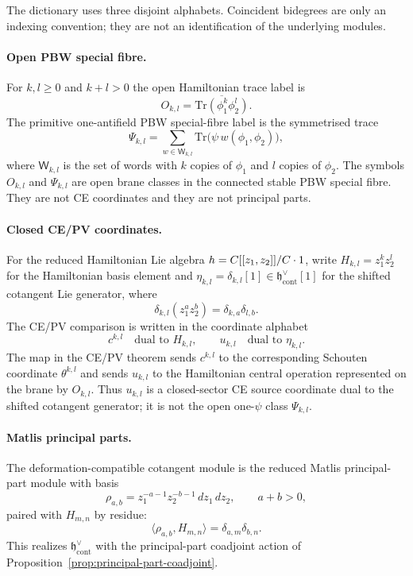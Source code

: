 \documentclass[11pt]{memoir}
\begin{document}
The dictionary uses three disjoint alphabets.  Coincident bidegrees are
only an indexing convention; they are not an identification of the
underlying modules.

\paragraph{Open PBW special fibre.}
For $k,l\geq0$ and $k+l>0$ the open Hamiltonian trace label is
$$O_{k,l}=\overline{\mathrm{Tr}(\phi_1^k\phi_2^l)}.$$
The primitive one-antifield PBW special-fibre label is the symmetrised
trace
$$\Psi_{k,l}
  =\sum_{w\in\mathsf W_{k,l}}
    \mathrm{Tr}\bigl(\psi\,w(\phi_1,\phi_2)\bigr),$$
where $\mathsf W_{k,l}$ is the set of words with $k$ copies of
$\phi_1$ and $l$ copies of $\phi_2$.  The symbols
$O_{k,l}$ and $\Psi_{k,l}$ are open brane classes in the connected
stable PBW special fibre.  They are not CE coordinates and they are
not principal parts.

\paragraph{Closed CE/PV coordinates.}
For the reduced Hamiltonian Lie algebra
$h=C[[z_1,z_2]]/C\cdot1$, write
$H_{k,l}=z_1^kz_2^l$ for the Hamiltonian basis element and
$\eta_{k,l}=\delta_{k,l}[1]\in\mathfrak h^\vee_{\mathrm{cont}}[1]$
for the shifted cotangent Lie generator, where
$$\delta_{k,l}(z_1^az_2^b)=\delta_{k,a}\delta_{l,b}.$$
The CE/PV comparison is written in the coordinate alphabet
$$c^{k,l}\quad\text{dual to }H_{k,l},\qquad
  u_{k,l}\quad\text{dual to }\eta_{k,l}.$$
The map in the CE/PV theorem sends $c^{k,l}$ to the corresponding
Schouten coordinate $\theta^{k,l}$ and sends $u_{k,l}$ to the
Hamiltonian central operation represented on the brane by $O_{k,l}$.
Thus $u_{k,l}$ is a closed-sector CE source coordinate dual to the shifted cotangent
generator; it is not the open one-$\psi$ class $\Psi_{k,l}$.

\paragraph{Matlis principal parts.}
The deformation-compatible cotangent module is the reduced Matlis
principal-part module with basis
$$\rho_{a,b}=z_1^{-a-1}z_2^{-b-1}\,dz_1\,dz_2,\qquad a+b>0,$$
paired with $H_{m,n}$ by residue:
$$\langle\rho_{a,b},H_{m,n}\rangle=\delta_{a,m}\delta_{b,n}.$$
This realizes $\mathfrak h^\vee_{\mathrm{cont}}$ with the
principal-part coadjoint action of
Proposition~\ref{prop:principal-part-coadjoint}.
\end{document}
